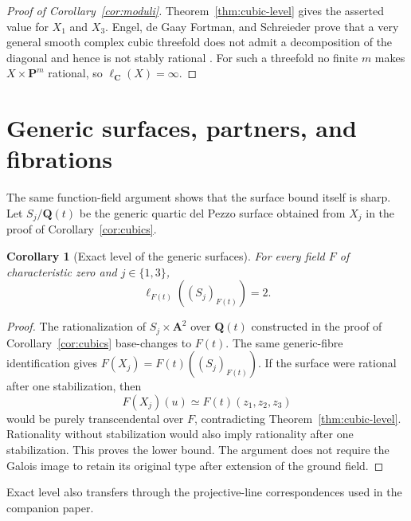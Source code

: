 \documentclass[11pt]{article}
\newtheorem{corollary}[theorem]{Corollary}
\theoremstyle{remark}
\newcommand{\A}{\mathbf A}
\newcommand{\C}{\mathbf C}
\newcommand{\PP}{\mathbf P}
\begin{document}
\begin{proof}[Proof of Corollary~\ref{cor:moduli}]
Theorem~\ref{thm:cubic-level} gives the asserted value for \(X_1\) and
\(X_3\).  Engel, de Gaay Fortman, and
Schreieder prove that a very general smooth complex cubic threefold does not
admit a decomposition of the diagonal and hence is not stably rational
\cite[Corollary~1.4]{EGFS}.  For such a threefold no finite \(m\) makes
\(X\times\PP^m\) rational, so \(\ell_{\C}(X)=\infty\).
%
%
\end{proof}

\appendix

\section{Generic surfaces, partners, and fibrations}\label{sec:additional}

The same function-field argument shows that the surface bound itself is
sharp.  Let \(S_j/\mathbf Q(t)\) be the generic quartic del Pezzo surface
obtained from \(X_j\) in the proof of Corollary~\ref{cor:cubics}.

\begin{corollary}[Exact level of the generic surfaces]
\label{cor:generic-surface-level}
%
%
%
For every field \(F\) of characteristic zero and \(j\in\{1,3\}\),
\[
 \ell_{F(t)}((S_j)_{F(t)})=2.
\]
\end{corollary}

\begin{proof}
The rationalization of \(S_j\times\A^2\) over \(\mathbf Q(t)\) constructed
in the proof of Corollary~\ref{cor:cubics} base-changes to \(F(t)\).
The same generic-fibre identification gives
\(F(X_j)=F(t)((S_j)_{F(t)})\).  If the surface were rational after one
stabilization, then
\[
 F(X_j)(u)\simeq F(t)(z_1,z_2,z_3)
\]
would be purely transcendental over \(F\), contradicting
Theorem~\ref{thm:cubic-level}.  Rationality without stabilization would
also imply rationality after one stabilization.  This proves the lower
bound.  The argument does not require the Galois image to retain its
original type after extension of the ground field.
%
%
\end{proof}

Exact level also transfers through the projective-line correspondences
used in the companion paper.
\end{document}
